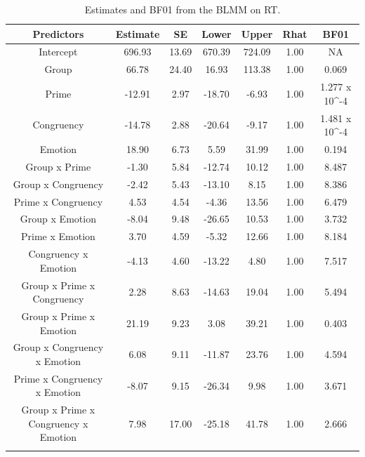 \documentclass[
  11pt,
  english,
  ,doc,floatsintext]{apa6}
\begin{document}
\begin{table}[htb]

\begin{center}
\begin{threeparttable}

\caption{\label{tab:summaryBMgcpe}Estimates and BF01 from the BLMM on RT.}

\small{

\begin{tabular}{ccccccc}
\toprule
Predictors & \multicolumn{1}{c}{Estimate} & \multicolumn{1}{c}{SE} & \multicolumn{1}{c}{Lower} & \multicolumn{1}{c}{Upper} & \multicolumn{1}{c}{Rhat} & \multicolumn{1}{c}{BF01}\\
\midrule
Intercept & 696.93 & 13.69 & 670.39 & 724.09 & 1.00 & NA\\
Group & 66.78 & 24.40 & 16.93 & 113.38 & 1.00 & 0.069\\
Prime & -12.91 & 2.97 & -18.70 & -6.93 & 1.00 & 1.277 x 10\textasciicircum{}-4\\
Congruency & -14.78 & 2.88 & -20.64 & -9.17 & 1.00 & 1.481 x 10\textasciicircum{}-4\\
Emotion & 18.90 & 6.73 & 5.59 & 31.99 & 1.00 & 0.194\\
Group x Prime & -1.30 & 5.84 & -12.74 & 10.12 & 1.00 & 8.487\\
Group x Congruency & -2.42 & 5.43 & -13.10 & 8.15 & 1.00 & 8.386\\
Prime x Congruency & 4.53 & 4.54 & -4.36 & 13.56 & 1.00 & 6.479\\
Group x Emotion & -8.04 & 9.48 & -26.65 & 10.53 & 1.00 & 3.732\\
Prime x Emotion & 3.70 & 4.59 & -5.32 & 12.66 & 1.00 & 8.184\\
Congruency x Emotion & -4.13 & 4.60 & -13.22 & 4.80 & 1.00 & 7.517\\
Group x Prime x Congruency & 2.28 & 8.63 & -14.63 & 19.04 & 1.00 & 5.494\\
Group x Prime x Emotion & 21.19 & 9.23 & 3.08 & 39.21 & 1.00 & 0.403\\
Group x Congruency x Emotion & 6.08 & 9.11 & -11.87 & 23.76 & 1.00 & 4.594\\
Prime x Congruency x Emotion & -8.07 & 9.15 & -26.34 & 9.98 & 1.00 & 3.671\\
Group x Prime x Congruency x Emotion & 7.98 & 17.00 & -25.18 & 41.78 & 1.00 & 2.666\\
\bottomrule
\addlinespace
\end{tabular}

}
\end{threeparttable}
\end{center}
\end{table}
\end{document}
